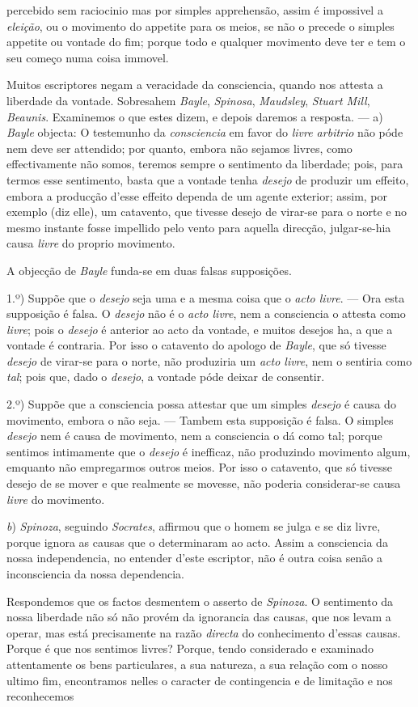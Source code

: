percebido sem raciocinio mas por simples apprehensão, assim é impossivel a \emph{eleição}, ou o movimento do appetite para os meios, se não o precede o simples appetite ou vontade do fim; porque todo e qualquer movimento deve ter e tem o seu começo numa coisa immovel.\par Muitos escriptores negam a veracidade da consciencia, quando nos attesta a liberdade da vontade. Sobresahem \emph{Bayle}, \emph{Spinosa}, \emph{Maudsley}, \emph{Stuart Mill}, \emph{Beaunis}. Examinemos o que estes dizem, e depois daremos a resposta. --- a) \emph{Bayle} objecta: O testemunho da \emph{consciencia} em favor do \emph{livre arbitrio} não póde nem deve ser attendido; por quanto, embora não sejamos livres, como effectivamente não somos, teremos sempre o sentimento da liberdade; pois, para termos esse sentimento, basta que a vontade tenha \emph{desejo} de produzir um effeito, embora a producção d'esse effeito dependa de um agente exterior; assim, por exemplo (diz elle), um catavento, que tivesse desejo de virar-se para o norte e no mesmo instante fosse impellido pelo vento para aquella direcção, julgar-se-hia causa \emph{livre} do proprio movimento.\par A objecção de \emph{Bayle} funda-se em duas falsas supposições.\par 1.º) Suppõe que o \emph{desejo} seja uma e a mesma coisa que o \emph{acto livre}. --- Ora esta supposição é falsa. O \emph{desejo} não é o \emph{acto livre}, nem a consciencia o attesta como \emph{livre}; pois o \emph{desejo} é anterior ao acto da vontade, e muitos desejos ha, a que a vontade é contraria. Por isso o catavento do apologo de \emph{Bayle}, que só tivesse \emph{desejo} de virar-se para o norte, não produziria um \emph{acto livre}, nem o sentiria como \emph{tal}; pois que, dado o \emph{desejo}, a vontade póde deixar de consentir.\par 2.º) Suppõe que a consciencia possa attestar que um simples \emph{desejo} é causa do movimento, embora o não seja. --- Tambem esta supposição é falsa. O simples \emph{desejo} nem é causa de movimento, nem a consciencia o dá como tal; porque sentimos intimamente que o \emph{desejo} é inefficaz, não produzindo movimento algum, emquanto não empregarmos outros meios. Por isso o catavento, que só tivesse desejo de se mover e que realmente se movesse, não poderia considerar-se causa \emph{livre} do movimento.\par \emph{b}) \emph{Spinoza}, seguindo \emph{Socrates}, affirmou que o homem se julga e se diz livre, porque ignora as causas que o determinaram ao acto. Assim a consciencia da nossa independencia, no entender d'este escriptor, não é outra coisa senão a inconsciencia da nossa dependencia.\par Respondemos que os factos desmentem o asserto de \emph{Spinoza}. O sentimento da nossa liberdade não só não provém da ignorancia das causas, que nos levam a operar, mas está precisamente na razão \emph{directa} do conhecimento d'essas causas. Porque é que nos sentimos livres? Porque, tendo considerado e examinado attentamente os bens particulares, a sua natureza, a sua relação com o nosso ultimo fim, encontramos nelles o caracter de contingencia e de limitação e nos reconhecemos 